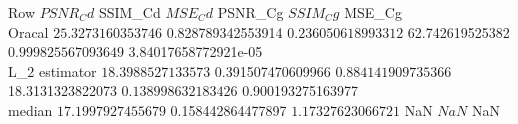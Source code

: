 Row $ PSNR_Cd $ SSIM_Cd $ MSE_Cd $ PSNR_Cg $ SSIM_Cg $ MSE_Cg \\ 
 \hline 
Oracal $ 25.3273160353746 $ 0.828789342553914 $ 0.236050618993312 $ 62.742619525382 $ 0.999825567093649 $ 3.84017658772921e-05 \\ 
 \hline 
L_2 estimator $ 18.3988527133573 $ 0.391507470609966 $ 0.884141909735366 $ 18.3131323822073 $ 0.138998632183426 $ 0.900193275163977 \\ 
 \hline 
median $ 17.1997927455679 $ 0.158442864477897 $ 1.17327623066721 $ NaN $ NaN $ NaN \\ 
 \hline 
